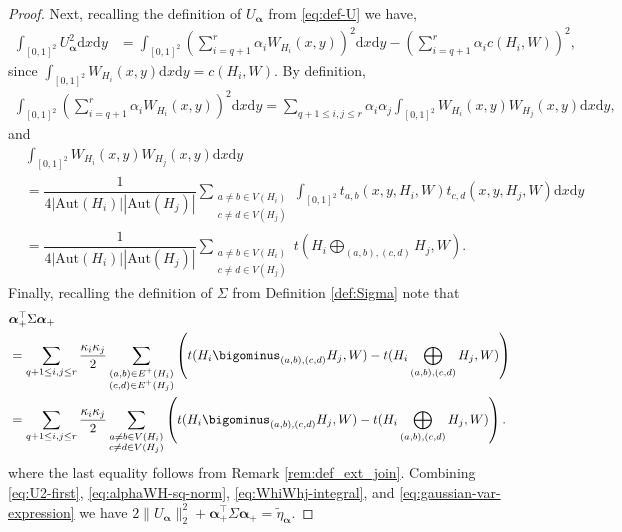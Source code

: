 \documentclass[11pt,reqno]{amsart}
\numberwithin{equation}{section}
\theoremstyle{definition}
\begin{document}
\begin{proof}
Next, recalling the definition of $U_{\bm \alpha}$ from \eqref{eq:def-U} we have,
\begin{align}\label{eq:U2-first}
    \int_{[0, 1]^2} U_{\bm \alpha}^{2}\mathrm{d}x\mathrm{d}y 
    & = \int_{[0, 1]^2}\left(\sum_{i=q+1}^{r}\alpha_{i}W_{H_{i}}(x,y)\right)^{2}\mathrm{d}x\mathrm{d}y - \left(\sum_{i=q+1}^{r}\alpha_{i}c(H_{i},W)\right)^{2} , 
\end{align}
since $\int_{[0, 1]^2}W_{H_{i}}(x,y)\mathrm{d}x\mathrm{d}y = c(H_{i},W)$. By definition,
\begin{align}\label{eq:alphaWH-sq-norm}
    \int_{[0, 1]^2}\left(\sum_{i=q+1}^{r}\alpha_{i}W_{H_{i}}(x,y)\right)^{2}\mathrm{d}x\mathrm{d}y = \sum_{q+1 \leq i,j \leq r} \alpha_{i}\alpha_{j}\int_{[0, 1]^2}W_{H_{i}}(x,y)W_{H_{j}}(x,y)\mathrm{d}x\mathrm{d}y , 
\end{align}
and 
\begin{align}\label{eq:WhiWhj-integral}
    & \int_{[0, 1]^2} W_{H_{i}}(x,y)
    W_{H_{j}}(x,y)\mathrm{d}x\mathrm{d}y \nonumber\\
    & = \dfrac{1}{4\left|\text{Aut}(H_{i})\right|\left|\text{Aut}(H_{j})\right|}\sum_{\substack{a\neq b\in V(H_{i})\\ c\neq d\in V(H_{j})}}\int_{[0, 1]^2}t_{a,b}(x,y,H_{i},W)t_{c,d}(x,y,H_{j},W)\mathrm{d}x\mathrm{d}y\nonumber\\
    & = \dfrac{1}{4\left|\text{Aut}(H_{i})\right|\left|\text{Aut}(H_{j})\right|}\sum_{\substack{a\neq b\in V(H_{i})\\ c\neq d\in V(H_{j})}} t\left(H_{i}\bigoplus_{(a,b),(c,d)}H_{j},W\right).
\end{align}
Finally, recalling the definition of $\Sigma$ from Definition \ref{def:Sigma} note that 
\begin{align}\label{eq:gaussian-var-expression}
    & \bm{\alpha}_{+}^{\top}\Sigma\bm{\alpha}_{+} \nonumber \\ 
    & = \sum_{q+1 \leq i, j \leq r} \frac{\kappa_{i}\kappa_{j}}{2} \sum_{\substack{(a,b)\in E^{+}(H_{i})\\(c,d)\in E^{+}(H_{j})}}\left(t(H_{i}\bigominus_{(a,b),(c,d)}H_{j},W) - t(H_{i}\bigoplus_{(a,b),(c,d)}H_{j},W)\right)\nonumber\\
    & = \sum_{q+1 \leq i, j \leq r} \frac{\kappa_{i}\kappa_{j}}{2}\sum_{\substack{a\neq b\in V(H_{i})\\c\neq d\in V(H_{j})}}\left(t(H_{i}\bigominus_{(a,b),(c,d)}H_{j},W) - t(H_{i}\bigoplus_{(a,b),(c,d)}H_{j},W)\right) . 
\end{align}
where the last equality follows from Remark \ref{rem:def_ext_join}. 
Combining \eqref{eq:U2-first}, \eqref{eq:alphaWH-sq-norm}, \eqref{eq:WhiWhj-integral}, and \eqref{eq:gaussian-var-expression} we have $2 \|U_{\bm \alpha}\|_{2}^{2} +  \bm{\alpha}_{+}^{\top}\Sigma\bm{\alpha}_{+} =\tilde \eta_{\bm \alpha}$. 
\end{proof}
\end{document}
